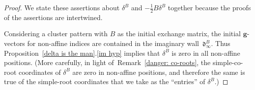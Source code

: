 \documentclass[10pt]{article}
\theoremstyle{definition}
\theoremstyle{remark}
\numberwithin{equation}{section}
\newcommand{\0}{{\mathbf{0}}}
\newcommand{\g}{\mathbf{g}}
\renewcommand{\d}{{\mathfrak d}}
\begin{document}
\begin{proof}
We state these assertions about $\delta^B$ and $-\frac12B\delta^B$ together because the proofs of the assertions are intertwined.

Considering a cluster pattern with $B$ as the initial exchange matrix, the initial $\g$-vectors for non-affine indices are contained in the imaginary wall~$\d^B_\infty$.
Thus Proposition~\ref{delta is the man}.\ref{im hyp} implies that $\delta^B$ is zero in all non-affine positions.
  (More carefully, in light of~Remark~\ref{danger: co-roots}, the simple-co-root coordinates of $\delta^B$ are zero in non-affine positions, and therefore the same is true of the simple-root coordinates that we take as the ``entries'' of $\delta^B$.) 


\end{proof}
\end{document}
